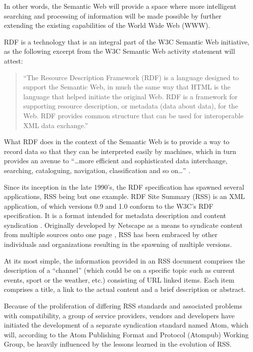 \documentclass{CRPITStyle}
\begin{document}
In other words, the Semantic Web will provide a space where more
intelligent searching and processing of information will be made
possible by further extending the existing capabilities of the World
Wide Web (WWW).

RDF is a technology that is an integral part of the W3C Semantic Web
initiative, as the following excerpt from the W3C Semantic Web activity
statement will attest:

\begin{quotation}
	``The Resource Description Framework (RDF) is a language designed to
	support the Semantic Web, in much the same way that HTML is the
	language that helped initiate the original Web. RDF is a framework
	for supporting resource description, or metadata (data about data),
	for the Web. RDF provides common structure that can be used for
	interoperable XML data exchange.'' \cite{Powe-S-2003-RDF}
\end{quotation}

What RDF does in the context of the Semantic Web is to provide a way to
record data so that they can be interpreted easily by machines, which in
turn provides an avenue to ``\ldots{}more efficient and sophisticated
data interchange, searching, cataloguing, navigation, classification and
so on\ldots{}'' \cite{Powe-S-2003-RDF}.

Since its inception in the late 1990's, the RDF specification has
spawned several applications, RSS being but one example. RDF Site
Summary (RSS) is an XML application, of which versions 0.9 and 1.0
conform to the W3C's RDF specification. It is a format intended for
metadata description and content syndication \cite{Mano-F-2004-RDF}.
Originally developed by Netscape as a means to syndicate content from
multiple sources onto one page \cite{Nott-M-2005-Atom}, RSS has been
embraced by other individuals and organizations resulting in the
spawning of multiple versions.

At its most simple, the information provided in an RSS document
comprises the description of a ``channel'' (which could be on a specific
topic such as current events, sport or the weather, etc.) consisting of
URL linked items. Each item comprises a title, a link to the actual
content and a brief description or abstract.

Because of the proliferation of differing RSS standards and associated
problems with compatibility, a group of service providers, vendors and
developers have initiated the development of a separate syndication
standard named Atom, which will, according to the Atom Publishing Format
and Protocol (Atompub) Working Group, be heavily influenced by the
lessons learned in the evolution of RSS.
\end{document}
